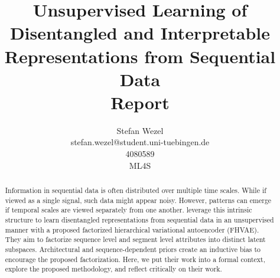 \documentclass{article} %
\title{Unsupervised Learning of Disentangled and Interpretable Representations from Sequential Data\\ \vspace{0.5cm}\large{Report}}
\author{Stefan Wezel \\ stefan.wezel@student.uni-tuebingen.de \\4080589  \\ ML4S}
\def\figwidth{.5\linewidth}
\def\figheight{.15\textheight}
\begin{document}
\maketitle

\begin{abstract}

%



Information in sequential data is often distributed over multiple time scales.
While if viewed as a single signal, such data might appear noisy. However, patterns can emerge if temporal scales are viewed separately from one another.
\citet{hsu2017unsupervised} leverage this intrinsic structure to learn disentangled representations from sequential data in an unsupervised manner with a proposed factorized hierarchical variational autoencoder (FHVAE). They aim to factorize sequence level and segment level attributes into distinct latent subspaces. Architectural and sequence-dependent priors create an inductive bias to encourage the proposed factorization. Here, we put their work into a formal context, explore the proposed methodology, and reflect critically on their work.
\end{abstract}
\end{document}
